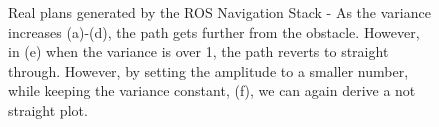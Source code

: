 \begin{figure}[b]
{\label{fig:d4}}
\caption{Real plans generated by the ROS Navigation Stack - As the variance increases (a)-(d), the path gets further from the obstacle. However, in (e) when the variance is over 1, the path reverts to straight through. However, by setting the amplitude to a smaller number, while keeping the variance constant, (f), we can again derive a not straight plot.  }
\label{fig:realdata}
\end{figure}

